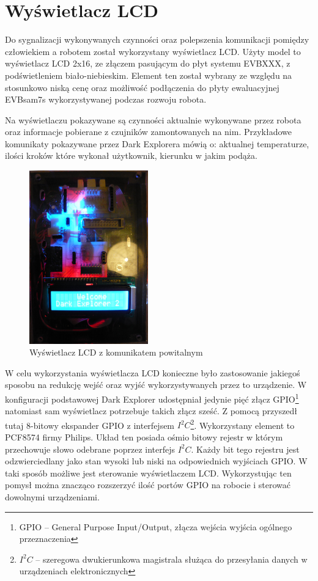 \section{Wyświetlacz LCD}
Do sygnalizacji wykonywanych czynności oraz polepszenia komunikacji pomiędzy człowiekiem a robotem został wykorzystany wyświetlacz LCD. Użyty model to wyświetlacz LCD 2x16, ze złączem pasującym do płyt systemu EVBXXX, z podświetleniem biało-niebieskim. Element ten został wybrany ze względu na stosunkowo niską cenę oraz możliwość podłączenia do płyty ewaluacyjnej EVBsam7s wykorzystywanej podczas rozwoju robota.

Na wyświetlaczu pokazywane są czynności aktualnie wykonywane przez robota oraz informacje pobierane z czujników zamontowanych na nim. Przykładowe komunikaty pokazywane przez Dark Explorera mówią o: aktualnej temperaturze, ilości kroków które wykonał użytkownik, kierunku w jakim podąża.

\begin{figure}[!ht]
 \centering
 \includegraphics[height=75mm]{../images/ch04/lcd_welcome.jpg}
 \caption{Wyświetlacz LCD z komunikatem powitalnym}
 \label{fig:LCD}
\end{figure}

W celu wykorzystania wyświetlacza LCD konieczne było zastosowanie jakiegoś sposobu na redukcję wejść oraz wyjść wykorzystywanych przez to urządzenie. W konfiguracji podstawowej Dark Explorer udostępniał jedynie pięć złącz GPIO\footnote{GPIO -- General Purpose Input/Output, złącza wejścia wyjścia ogólnego przeznaczenia} natomiast sam wyświetlacz potrzebuje takich złącz sześć. Z pomocą przyszedł tutaj 8-bitowy ekspander GPIO z interfejsem $I^{2}C$\footnote{$I^{2}C$ -- szeregowa dwukierunkowa magistrala służąca do przesyłania danych w urządzeniach elektronicznych}. Wykorzystany element to PCF8574 firmy Philips. Układ ten posiada ośmio bitowy rejestr w którym przechowuje słowo odebrane poprzez interfejs $I^{2}C$. Każdy bit tego rejestru jest odzwierciedlany jako stan wysoki lub niski na odpowiednich wyjściach GPIO. W taki sposób możliwe jest sterowanie wyświetlaczem LCD. Wykorzystując ten pomysł można znacząco rozszerzyć ilość portów GPIO na robocie i sterować dowolnymi urządzeniami.

